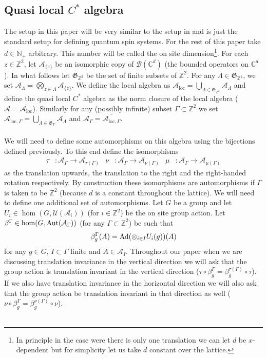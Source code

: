 \documentclass[12pt,a4paper,twoside]{article}
\let\originalleft\left
\let\originalright\right
\renewcommand{\left}{\mathopen{}\mathclose\bgroup\originalleft}
\renewcommand{\right}{\aftergroup\egroup\originalright}
\newcommand{\UU}{\mathcal U}
\newcommand{\BB}{\mathcal B}
\newcommand{\ZZ}{\mathbb Z}
\newcommand{\CC}{\mathbb C}
\renewcommand{\AA}{\mathcal A}
\newcommand{\NN}{\mathbb{N}}
\newcommand{\Ad}[1]{\textrm{Ad}\left(#1\right)}
\newcommand{\Aut}[1]{\textrm{Aut}\left(#1\right)}
\theoremstyle{definition}
\numberwithin{equation}{section}
\begin{document}
\subsection{Quasi local $C^*$ algebra}\label{sec:QuasiLocalC*Algebra}
The setup in this paper will be very similar to the setup in \cite{ogata2021h3gmathbb} and is just the standard setup for defining quantum spin systems. For the rest of this paper take $d\in\NN_+$ arbitrary. This number will be called the on site dimension\footnote{In principle in the case were there is only one translation we can let $d$ be $x$-dependent but for simplicity let us take $d$ constant over the lattice.}. For each $z\in\ZZ^2$, let $\AA_{\{z\}}$ be an isomorphic copy of $\BB(\CC^d)$ (the bounded operators on $\CC^d$). In what follows let $\mathfrak{G}_{\ZZ^2}$ be the set of finite subsets of $\ZZ^2$. For any $\Lambda\in\mathfrak{G}_{\ZZ^2}$, we set $\AA_\Lambda=\bigotimes_{z\in\Lambda}\AA_{\{z\}}$. We define the local algebra as $\AA_{\text{loc}}=\bigcup_{\Lambda\in \mathfrak{G}_{\ZZ^2}}\AA_{\Lambda}$ and define the quasi local $C^*$ algebra as the norm closure of the local algebra ($\AA=\overline{\AA_{\text{loc}}}$). Similarly for any (possibly infinite) subset $\Gamma\subset\ZZ^2$ we set $\AA_{\text{loc},\Gamma}=\bigcup_{\Lambda\in \mathfrak{G}_{\Gamma}}\AA_{\Lambda}$ and $\AA_\Gamma=\overline{\AA_{\text{loc},\Gamma}}$.\\\\
We will need to define some automorphisms on this algebra using the bijections defined previously. To this end define the isomorphisms
\begin{align}
	\tau&:\AA_\Gamma\rightarrow\AA_{\tau(\Gamma)}&\nu&:\AA_\Gamma\rightarrow\AA_{\nu(\Gamma)}&\mu&:\AA_\Gamma\rightarrow\AA_{\mu(\Gamma)}
\end{align}
as the translation upwards, the translation to the right and the right-handed rotation respectively. By construction these isomorphisms are automorphisms if $\Gamma$ is taken to be $\ZZ^2$ (because $d$ is a constant throughout the lattice). We will need to define one additional set of automorphisms. Let $G$ be a group and let $U_i\in\hom(G,\UU(\AA_i))$ (for $i\in\ZZ^2$) be the on site group action. Let $\beta^\Gamma\in\hom(G,\Aut{\AA_\Gamma})$ (for any $\Gamma\subset\ZZ^2$) be such that
\begin{equation}
	\beta^\Gamma_g(A)=\Ad{\otimes_{i\in I} U_i(g)}(A)
\end{equation}
for any $g\in G$, $I\subset\Gamma$ finite and $A\in\AA_I$. Throughout our paper when we are discussing translation invariance in the vertical direction we will ask that the group action is translation invariant in the vertical direction ($\tau\circ\beta_g^\Gamma=\beta_g^{\tau(\Gamma)}\circ\tau$). If we also have translation invariance in the horizontal direction we will also ask that the group action be translation invariant in that direction as well ($\nu\circ\beta_g^\Gamma=\beta_g^{\nu(\Gamma)}\circ\nu$).\\\\
\end{document}
